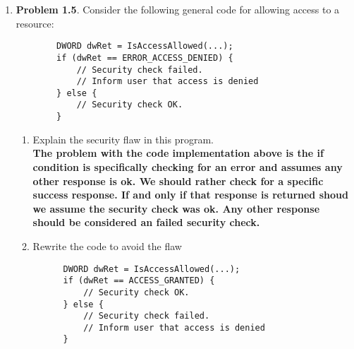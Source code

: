 \documentclass[12pt]{article}
\begin{document}
\begin{enumerate}
\begin{enumerate}
	\end{enumerate}
	\vspace{20pt}


	\item {\textbf{Problem 1.5}. Consider the following general code for allowing access to a resource: } \\

	\begin{verbatim}
		DWORD dwRet = IsAccessAllowed(...);
		if (dwRet == ERROR_ACCESS_DENIED) {
		    // Security check failed.
		    // Inform user that access is denied
		} else {
		    // Security check OK.
		}
	\end{verbatim}

	\begin{enumerate}
		\item{Explain the security flaw in this program.} \\

    \textbf{The problem with the code implementation above is the if condition is specifically checking for an error and assumes any other response is ok. We should rather check for a specific success response. If and only if that response is returned shoud we assume the security check was ok. Any other response should be considered an failed security check.}

		\item{Rewrite the code to avoid the flaw} \\

    \begin{verbatim}
      DWORD dwRet = IsAccessAllowed(...);
      if (dwRet == ACCESS_GRANTED) {
          // Security check OK.
      } else {
          // Security check failed.
          // Inform user that access is denied
      }
    \end{verbatim}


	\end{enumerate}
	\vspace{40pt}



\end{enumerate}
\end{document}
